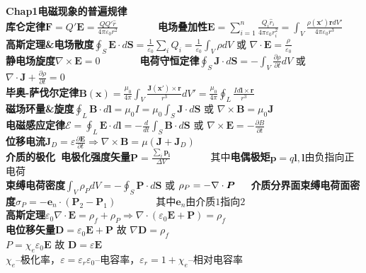 \documentclass[10pt,a4paper]{article}
\begin{document}
\scriptsize
\begin{multicols}{2}
\noindent\textbf{Chap1电磁现象的普遍规律}\\
\textbf{库仑定律}$\bm{F}=Q'\bm{E}=\frac{QQ'\hat{r}}{4\pi\varepsilon_0r^2}$~~~~~~~~\textbf{电场叠加性}$\bm{E}=\sum_{i=1}^n\frac{Q_i\hat{r}_i}{4\pi\varepsilon_0r_i^2}=\int_V\frac{\rho(\bm{x}')\bm{r}dV'}{4\pi\varepsilon_0r^3}$\\
\textbf{高斯定理\&电场散度}$\oint_S\bm{E}\cdot d\bm{S}=\frac{1}{\varepsilon_0}\sum_iQ_i=\frac{1}{\varepsilon_0}\int_V\rho dV$ 或 $\nabla\cdot\bm{E}=\frac{\rho}{\varepsilon_0}$\\
\textbf{静电场旋度}$\nabla\times\bm{E}=0$~~~~~~~~\textbf{电荷守恒定律}$\oint_S\bm{J}\cdot d\bm{S}=-\int_V\frac{\partial\rho}{\partial t}dV$ 或 $\nabla\cdot\bm{J}+\frac{\partial\rho}{\partial t}=0$\\
\textbf{毕奥-萨伐尔定律}$\bm{B}(\bm{x})=\frac{\mu_0}{4\pi}\int_V\frac{\bm{J}(\bm{x}')\times \bm{r}}{r^3}dV'=\frac{\mu_0}{4\pi}\oint_L\frac{Id\bm{l}\times\bm{r}}{r^3}$\\
\textbf{磁场环量\&旋度}$\oint_L\bm{B}\cdot d\bm{l}=\mu_0I=\mu_0\int_S\bm{J}\cdot d\bm{S}$ 或 $\nabla\times\bm{B}=\mu_0\bm{J}$\\
\textbf{电磁感应定律}$\mathscr{E}=\oint_L\bm{E}\cdot d\bm{l}=-\frac{d}{dt}\int_S\bm{B}\cdot d\bm{S}$ 或 $\nabla\times\bm{E}=-\frac{\partial B}{\partial t}$\\
\textbf{位移电流}$\bm{J}_D=\varepsilon\frac{\partial\bm{E}}{\partial t}\Rightarrow\nabla\times\bm{B}=\mu(\bm{J}+\bm{J}_D)$\\
\textbf{介质的极化~电极化强度矢量}$\bm{P}=\frac{\sum_i\bm{p_i}}{\Delta V}$~~~~~~~~其中\textbf{电偶极矩}$\bm{p}=q\bm{l},\bm{l}$由负指向正电荷\\
\indent\textbf{束缚电荷密度}$\int_V\rho_PdV=-\oint_S\bm{P}\cdot d\bm{S}$ 或 $\rho_P=-\nabla\cdot\bm{P}\\
\indent$\textbf{介质分界面束缚电荷面密度}$\sigma_P=-\bm{e}_n\cdot(\bm{P}_2-\bm{P}_1)$~~~~~~~~其中$\bm{e}_n$由介质$1$指向$2$\\
\indent\textbf{高斯定理}$\varepsilon_0\nabla\cdot\bm{E}=\rho_f+\rho_P\Rightarrow\nabla\cdot(\varepsilon_0\bm{E}+\bm{P})=\rho_f$\\
\indent\textbf{电位移矢量}$\bm{D}=\varepsilon_0\bm{E}+\bm{P}$ 故 $\nabla\bm{D}=\rho_f$\\
$P=\chi_e\varepsilon_0\bm{E}$ 故 $\bm{D}=\varepsilon\bm{E}$\\
\indent{}$\chi_e$--极化率，$\varepsilon=\varepsilon_r\varepsilon_0$--电容率，$\varepsilon_r=1+\chi_e$--相对电容率\\

\end{multicols}
\end{document}
